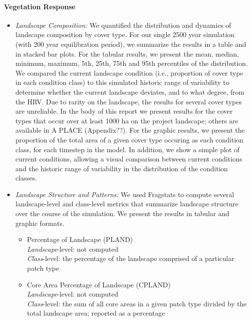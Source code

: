 \paragraph{Vegetation Response} 

\begin{itemize}
\item \emph{Landscape Composition:} We quantified the distribution and dynamics of landscape composition by cover type. For our single 2500 year simulation (with 200 year equilibration period), we summarize the results in a table and in stacked bar plots. For the tabular results, we present the mean, median, minimum, maximum, 5th, 25th, 75th and 95th percentiles of the distribution. We compared the current landscape condition (i.e., proportion of cover type in each condition class) to this simulated historic range of variability to determine whether the current landscape deviates, and to what degree, from the HRV. Due to rarity on the landscape, the results for several cover types are unreliable. In the body of this report we present results for the cover types that occur over at least 1000 ha on the project landscape; others are available in A PLACE (Appendix??). For the graphic results, we present the proportion of the total area of a given cover type occuring as each condition class, for each timestep in the model. In addition, we show a simple plot of current conditions, allowing a visual comparison between current conditions and the historic range of variability in the distribution of the condition classes.

\item \emph{Landscape Structure and Patterns:} We used Fragstats to compute several landscape-level and class-level metrics that summarize landscape structure over the course of the simulation. We present the results in tabular and graphic formats.
	\begin{itemize}
		\item Percentage of Landscape (PLAND)\\
		\emph{Landscape}-level: not computed\\
		\emph{Class}-level: the percentage of the landscape comprised of a particular patch type\\
		
		\item Core Area Percentage of Landscape (CPLAND)\\
		\emph{Landscape}-level: not computed\\
		\emph{Class}-level: the sum of all core areas in a given patch type divided by the total landscape area; reported as a percentage\\


\end{itemize}
\end{itemize}
